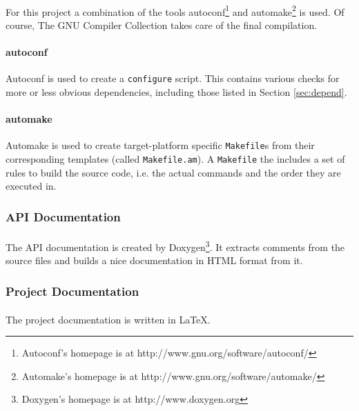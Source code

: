 \paragraph{}
For this project a combination of the tools autoconf\footnote{Autoconf's homepage is at http://www.gnu.org/software/autoconf/} and automake\footnote{Automake's homepage is at http://www.gnu.org/software/automake/} is used. Of course, The GNU Compiler Collection  takes care of the final compilation.

\paragraph{autoconf}
Autoconf is used to create a \texttt{configure} script. This contains various checks for more or less obvious dependencies, including those listed in Section \ref{sec:depend}.

\paragraph{automake}
Automake is used to create target-platform specific \texttt{Makefile}s from their corresponding templates (called \texttt{Makefile.am}). A \texttt{Makefile} the includes a set of rules to build the source code, i.e. the actual commands and the order they are executed in.

\subsubsection{API Documentation}
\paragraph{}
The API documentation is created by Doxygen\footnote{Doxygen's homepage is at http://www.doxygen.org}. It extracts comments from the source files and builds a nice documentation in HTML format from it.


\subsubsection{Project Documentation}
\paragraph{}
The project documentation is written in \LaTeX.
